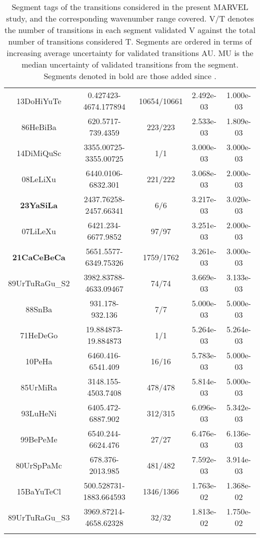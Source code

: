 \begin{longtable}{c c c c c}
    13DoHiYuTe \cite{13DoHiYuTe} & 0.427423-4674.177894 & 10654/10661 & 2.492e-03 & 1.000e-03 \\
    86HeBiBa \cite{86HeBiBa} & 620.5717-739.4359 & 223/223 & 2.533e-03 & 1.809e-03 \\
    14DiMiQuSc \cite{14DiMiQuSc} & 3355.00725-3355.00725 & 1/1 & 3.000e-03 & 3.000e-03 \\
    08LeLiXu \cite{08LeLiXu} & 6440.0106-6832.301 & 221/222 & 3.068e-03 & 2.000e-03 \\
    \textbf{23YaSiLa} \cite{23YaSiLa} & 2437.76258-2457.66341 & 6/6 & 3.217e-03 & 3.020e-03 \\
    07LiLeXu \cite{07LiLeXu} & 6421.234-6677.9852 & 97/97 & 3.251e-03 & 2.000e-03 \\
    \textbf{21CaCeBeCa} \cite{21CaCeBeCa} & 5651.5577-6349.75326 & 1759/1762 & 3.261e-03 & 3.000e-03 \\
    89UrTuRaGu\_S2 \cite{89UrTuRaGu} & 3982.83788-4633.09467 & 74/74 & 3.669e-03 & 3.133e-03 \\
    88SnBa \cite{88SnBa} & 931.178-932.136 & 7/7 & 5.000e-03 & 5.000e-03 \\
    71HeDeGo \cite{71HeDeGo} & 19.884873-19.884873 & 1/1 & 5.264e-03 & 5.264e-03 \\
    10PeHa \cite{10PeHa} & 6460.416-6541.409 & 16/16 & 5.783e-03 & 5.000e-03 \\
    85UrMiRa \cite{85UrMiRa} & 3148.155-4503.7408 & 478/478 & 5.814e-03 & 5.000e-03 \\
    93LuHeNi \cite{93LuHeNi} & 6405.472-6887.902 & 312/315 & 6.096e-03 & 5.342e-03 \\
    99BePeMe \cite{99BePeMe} & 6540.244-6624.476 & 27/27 & 6.476e-03 & 6.136e-03 \\
    80UrSpPaMc \cite{80UrSpPaMc} & 678.376-2013.985 & 481/482 & 7.592e-03 & 3.914e-03 \\
    15BaYuTeCl \cite{15BaYuTeCl} & 500.528731-1883.664593 & 1346/1366 & 1.763e-02 & 1.368e-02 \\
    89UrTuRaGu\_S3 \cite{89UrTuRaGu} & 3969.87214-4658.62328 & 32/32 & 1.813e-02 & 1.750e-02 \\
    \hline
    \caption{Segment tags of the transitions considered in the present MARVEL study, and the corresponding wavenumber range covered. V/T denotes the number of transitions in each segment validated V against the total number of transitions considered T. Segments are ordered in terms of increasing average uncertainty for validated transitions AU. MU is the median uncertainty of validated transitions from the segment. Segments denoted in bold are those added since \cite{20FuCoTe}.}
    \end{longtable}